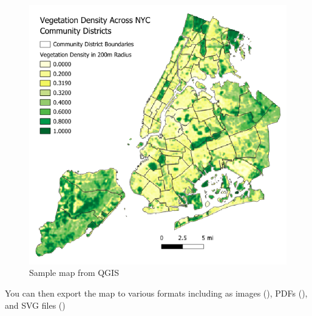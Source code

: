 \documentclass[
  letterpaper,
  DIV=11,
  numbers=noendperiod]{scrreprt}
\begin{document}
\begin{figure}

{\centering \includegraphics{./images/final_map.png}

}

\caption{Sample map from QGIS}

\end{figure}

You can then export the map to various formats including as images
(), PDFs
(), and SVG files
()
\end{document}
